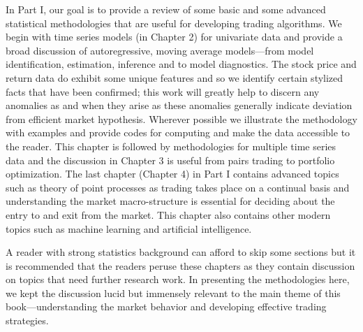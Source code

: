 
In Part I, our goal is to provide a review of some basic and some advanced statistical methodologies that are useful for developing trading algorithms. We begin with time series models (in Chapter 2) for univariate data and provide a broad discussion of autoregressive, moving average models---from model identification, estimation, inference and to model diagnostics. The stock price and return data do exhibit some unique features and so we identify certain stylized facts that have been confirmed; this work will greatly help to discern any anomalies as and when they arise as these anomalies generally indicate deviation from efficient market hypothesis. Wherever possible we illustrate the methodology with examples and provide codes for computing and make the data accessible to the reader. This chapter is followed by methodologies for multiple time series data and the discussion in Chapter 3 is useful from pairs trading to portfolio optimization. The last chapter (Chapter 4) in Part I contains advanced topics such as theory of point processes as trading takes place on a continual basis and understanding the market macro-structure is essential for deciding about the entry to and exit from the market. This chapter also contains other modern topics such as machine learning and artificial intelligence. 


A reader with strong statistics background can afford to skip some sections but it is recommended that the readers peruse these chapters as they contain discussion on topics that need further research work. In presenting the methodologies here, we kept the discussion lucid but immensely relevant to the main theme of this book---understanding the market behavior and developing effective trading strategies. 








